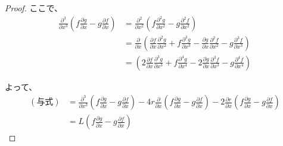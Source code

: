 \begin{proof}
ここで、
\begin{align*}
    \frac{\partial^3}{\partial x^3} \left( f\frac{\partial g}{\partial x} - g\frac{\partial f}{\partial x} \right) &= \frac{\partial^2}{\partial x^2} \left( f\frac{\partial^2 g}{\partial x^2} - g\frac{\partial^2 f}{\partial x^2} \right) \\
    &= \frac{\partial}{\partial x} \left( \frac{\partial f}{\partial x}\frac{\partial^2 g}{\partial x^2} + f\frac{\partial^3 g}{\partial x^3} - \frac{\partial g}{\partial x}\frac{\partial^2 f}{\partial x^2} - g\frac{\partial^3 f}{\partial x^3} \right) \\
    &= \left( 2\frac{\partial f}{\partial x}\frac{\partial^3 g}{\partial x^3} + f\frac{\partial^4 g}{\partial x^4} - 2\frac{\partial g}{\partial x}\frac{\partial^3 f}{\partial x^3} - g\frac{\partial^4 f}{\partial x^4} \right)
\end{align*}

よって、
\begin{align*}
    (\text{与式}) &= \frac{\partial^3}{\partial x^3} \left( f\frac{\partial g}{\partial x} - g\frac{\partial f}{\partial x} \right) - 4r \frac{\partial}{\partial x} \left( f\frac{\partial g}{\partial x} - g\frac{\partial f}{\partial x} \right) - 2\frac{\partial r}{\partial x} \left( f\frac{\partial g}{\partial x} - g\frac{\partial f}{\partial x} \right) \\
    &= L \left( f\frac{\partial g}{\partial x} - g\frac{\partial f}{\partial x} \right)
\end{align*}
\end{proof}

